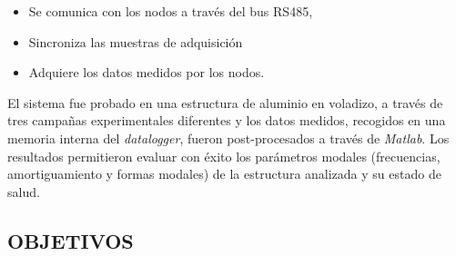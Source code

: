 \documentclass[12pt,letterpaper]{article}
\begin{document}
\begin{itemize}
	\item Se comunica con los nodos a través del bus RS485, 
	\item Sincroniza las muestras de adquisición
	\item Adquiere los datos medidos por los nodos.
\end{itemize} 

El sistema fue probado en una estructura de aluminio en voladizo, a través de tres campañas experimentales diferentes y los datos medidos, recogidos en una memoria interna del \textit{datalogger}, fueron post-procesados a través de \textit{Matlab}. Los resultados permitieron evaluar con éxito los parámetros modales (frecuencias, amortiguamiento y formas modales) de la estructura analizada y su estado de salud.



\newpage


\begin{center}
	\section*{OBJETIVOS}
\end{center}

\vspace{1cm}
\end{document}
